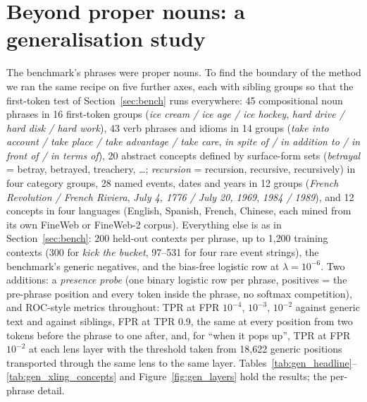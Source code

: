 \documentclass[11pt]{article}
\begin{document}
\section{Beyond proper nouns: a generalisation study}
\label{sec:gen}
The benchmark's phrases were proper nouns. To find the boundary of the method we ran the same recipe on five further axes, each with sibling groups so that the first-token test of Section~\ref{sec:bench} runs everywhere: 45 compositional noun phrases in 16 first-token groups (\emph{ice cream / ice age / ice hockey}, \emph{hard drive / hard disk / hard work}), 43 verb phrases and idioms in 14 groups (\emph{take into account / take place / take advantage / take care}, \emph{in spite of / in addition to / in front of / in terms of}), 20 abstract concepts defined by surface-form sets (\emph{betrayal} = betray, betrayed, treachery, \ldots; \emph{recursion} = recursion, recursive, recursively) in four category groups, 28 named events, dates and years in 12 groups (\emph{French Revolution / French Riviera}, \emph{July 4, 1776 / July 20, 1969}, \emph{1984 / 1989}), and 12 concepts in four languages (English, Spanish, French, Chinese, each mined from its own FineWeb or FineWeb-2 corpus). Everything else is as in Section~\ref{sec:bench}: 200 held-out contexts per phrase, up to 1{,}200 training contexts (300 for \emph{kick the bucket}, 97--531 for four rare event strings), the benchmark's generic negatives, and the bias-free logistic row at $\lambda=10^{-6}$. Two additions: a \emph{presence probe} (one binary logistic row per phrase, positives = the pre-phrase position and every token inside the phrase, no softmax competition), and ROC-style metrics throughout: TPR at FPR $10^{-4}$, $10^{-3}$, $10^{-2}$ against generic text and against siblings, FPR at TPR 0.9, the same at every position from two tokens before the phrase to one after, and, for ``when it pops up'', TPR at FPR $10^{-2}$ at each lens layer with the threshold taken from 18{,}622 generic positions transported through the same lens to the same layer. Tables~\ref{tab:gen_headline}--\ref{tab:gen_xling_concepts} and Figure~\ref{fig:gen_layers} hold the results;  the per-phrase detail.




\end{document}
